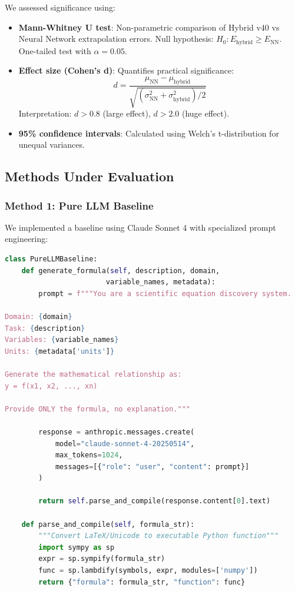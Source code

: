 \documentclass[twoside,11pt]{article}
\begin{document}
We assessed significance using:

\begin{itemize}
    \item \textbf{Mann-Whitney U test}: Non-parametric comparison of Hybrid v40 vs Neural Network extrapolation errors. Null hypothesis: $H_0: E_{\text{hybrid}} \geq E_{\text{NN}}$. One-tailed test with $\alpha = 0.05$.

    \item \textbf{Effect size (Cohen's d)}: Quantifies practical significance:
    \begin{equation}
    d = \frac{\mu_{\text{NN}} - \mu_{\text{hybrid}}}{\sqrt{(\sigma_{\text{NN}}^2 + \sigma_{\text{hybrid}}^2)/2}}
    \end{equation}
    Interpretation: $d > 0.8$ (large effect), $d > 2.0$ (huge effect).

    \item \textbf{95\% confidence intervals}: Calculated using Welch's t-distribution for unequal variances.
\end{itemize}


\subsection{Methods Under Evaluation}

\subsubsection{Method 1: Pure LLM Baseline}

We implemented a baseline using Claude Sonnet 4 with specialized prompt engineering:

\begin{lstlisting}[language=Python, caption=Pure LLM Formula Generation]
class PureLLMBaseline:
    def generate_formula(self, description, domain,
                        variable_names, metadata):
        prompt = f"""You are a scientific equation discovery system.

Domain: {domain}
Task: {description}
Variables: {variable_names}
Units: {metadata['units']}

Generate the mathematical relationship as:
y = f(x1, x2, ..., xn)

Provide ONLY the formula, no explanation."""

        response = anthropic.messages.create(
            model="claude-sonnet-4-20250514",
            max_tokens=1024,
            messages=[{"role": "user", "content": prompt}]
        )

        return self.parse_and_compile(response.content[0].text)

    def parse_and_compile(self, formula_str):
        """Convert LaTeX/Unicode to executable Python function"""
        import sympy as sp
        expr = sp.sympify(formula_str)
        func = sp.lambdify(symbols, expr, modules=['numpy'])
        return {"formula": formula_str, "function": func}
\end{lstlisting}
\end{document}
